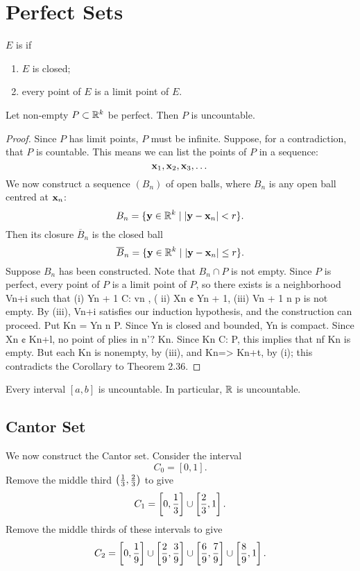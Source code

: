 \section{Perfect Sets}
\begin{definition}
$E$ is  if
\begin{enumerate}[label=(\roman*)]
\item $E$ is closed;
\item every point of $E$ is a limit point of $E$.
\end{enumerate}
\end{definition}

\begin{proposition}
Let non-empty $P\subset\mathbb R^k$ be perfect. Then $P$ is uncountable.
\end{proposition}

\begin{proof}
Since $P$ has limit points, $P$ must be infinite. 
Suppose, for a contradiction, that $P$ is countable. This means we can list the points of $P$ in a sequence:
\[\vb{x}_1,\vb{x}_2,\vb{x}_3,\dots\]
We now construct a sequence $(B_n)$ of open balls, where $B_n$ is any open ball centred at $\vb{x}_n$:
\[B_n=\{\vb{y}\in\mathbb R^k\mid |\vb{y}-\vb{x}_n|<r\}.\]
Then its closure $\overline{B}_n$ is the closed ball
\[\overline{B}_n=\{\vb{y}\in\mathbb R^k\mid |\vb{y}-\vb{x}_n|\le r\}.\]
Suppose $B_n$ has been constructed. Note that $B_n\cap P$ is not empty. Since $P$ is perfect, every point of $P$ is a limit point of $P$, so there exists  is a neighborhood Vn+i such
that (i) Yn + 1 C: vn , ( ii) Xn ¢ Yn + 1, (iii) Vn + 1 n p is not empty. By (iii),
Vn+i satisfies our induction hypothesis, and the construction can proceed.
Put Kn = Yn n P. Since Yn is closed and bounded, Yn is compact.
Since Xn ¢ Kn+l, no point of plies in n'? Kn. Since Kn C: P, this implies
that nf Kn is empty. But each Kn is nonempty, by (iii), and Kn=> Kn+t,
by (i); this contradicts the Corollary to Theorem 2.36. 
\end{proof}

\begin{corollary}
Every interval $[a,b]$ is uncountable. In particular, $\mathbb R$ is uncountable.
\end{corollary}

\subsection{Cantor Set}
We now construct the Cantor set. Consider the interval
\[C_0=[0,1].\]
Remove the middle third $\left(\frac{1}{3},\frac{2}{3}\right)$ to give
\[C_1=\left[0,\frac{1}{3}\right]\cup\left[\frac{2}{3},1\right].\]
Remove the middle thirds of these intervals to give
\[C_2=\left[0,\frac{1}{9}\right]\cup\left[\frac{2}{9},\frac{3}{9}\right]\cup\left[\frac{6}{9},\frac{7}{9}\right]\cup\left[\frac{8}{9},1\right].\]

